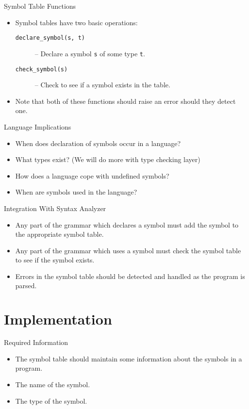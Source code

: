 \documentclass[]{beamer}
\begin{document}
\begin{frame}{Symbol Table Functions}
    \begin{itemize}[<+->]
        \item Symbol tables have two basic operations:
        \begin{description}
            \item[\texttt{declare\_symbol(s, t)}] -- Declare a symbol \texttt{s} of some
                type \texttt{t}.
            \item[\texttt{check\_symbol(s)}] -- Check to see if a symbol exists
                in the table.
        \end{description}
        \item Note that both of these functions should raise an error
            should they detect one.
    \end{itemize}
\end{frame}

\begin{frame}{Language Implications}
    \begin{itemize}[<+->]
        \item When does declaration of symbols occur in a language?
        \item What types exist? (We will do more with type checking
            layer)
        \item How does a language cope with undefined symbols?
        \item When are symbols used in the language?
    \end{itemize}
\end{frame}

\begin{frame}{Integration With Syntax Analyzer}
    \begin{itemize}[<+->]
        \item Any part of the grammar which declares a symbol must add
            the symbol to the appropriate symbol table.
        \item Any part of the grammar which uses a symbol must check
            the symbol table to see if the symbol exists.
        \item Errors in the symbol table should be detected and
            handled as the program is parsed.
    \end{itemize}
\end{frame}

\section{Implementation}
\begin{frame}{Required Information}
    \begin{itemize}[<+->]
        \item The symbol table should maintain some information about
            the symbols in a program.
        \item The name of the symbol.
        \item The type of the symbol.
    \end{itemize}
\end{frame}
\end{document}
